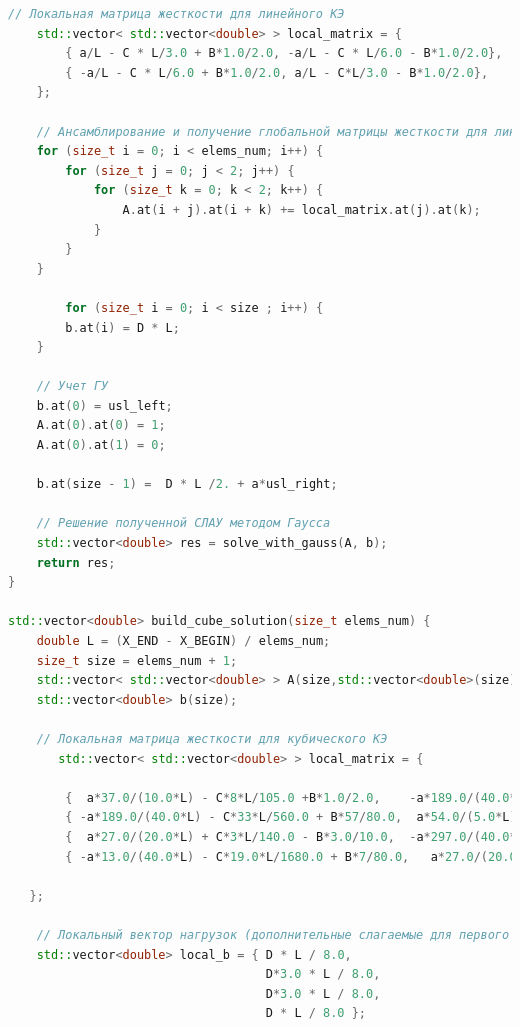 \begin{lstlisting}[language=c++, label=prog,caption={\textit{Реализация МКЭ}}]
    // Локальная матрица жесткости для линейного КЭ
    std::vector< std::vector<double> > local_matrix = {
        { a/L - C * L/3.0 + B*1.0/2.0, -a/L - C * L/6.0 - B*1.0/2.0},
        { -a/L - C * L/6.0 + B*1.0/2.0, a/L - C*L/3.0 - B*1.0/2.0},
    };
    
    // Ансамблирование и получение глобальной матрицы жесткости для линейного КЭ
    for (size_t i = 0; i < elems_num; i++) {
        for (size_t j = 0; j < 2; j++) {
            for (size_t k = 0; k < 2; k++) {
                A.at(i + j).at(i + k) += local_matrix.at(j).at(k);
            }
        }
    }
    
        for (size_t i = 0; i < size ; i++) {
        b.at(i) = D * L;
    }
    
    // Учет ГУ 
    b.at(0) = usl_left;
    A.at(0).at(0) = 1;
    A.at(0).at(1) = 0;
    
    b.at(size - 1) =  D * L /2. + a*usl_right;
    
    // Решение полученной СЛАУ методом Гаусса
    std::vector<double> res = solve_with_gauss(A, b);
    return res;
}

std::vector<double> build_cube_solution(size_t elems_num) {
    double L = (X_END - X_BEGIN) / elems_num;
    size_t size = elems_num + 1;
    std::vector< std::vector<double> > A(size,std::vector<double>(size));
    std::vector<double> b(size);
    
    // Локальная матрица жесткости для кубического КЭ
       std::vector< std::vector<double> > local_matrix = {

        {  a*37.0/(10.0*L) - C*8*L/105.0 +B*1.0/2.0,    -a*189.0/(40.0*L) - C*33*L/560.0 - B*57/80.0, a*27.0/(20.0*L) + C*3*L/140.0 + B*3.0/10.0, -a*13.0/(40.0*L) -  C*19.0*L/1680.0 - B*7/80.0},
        { -a*189.0/(40.0*L) - C*33*L/560.0 + B*57/80.0,  a*54.0/(5.0*L)-C*27*L/70.0,                  -a*297.0/(40*L) + C*27*L/560.0 - B*81.0/80.0,    a*27.0/(20.0*L) +  C*3*L/140.0 + B*3.0/10.0},
        {  a*27.0/(20.0*L) + C*3*L/140.0 - B*3.0/10.0,  -a*297.0/(40.0*L) + C*27*L/560.0 + B*81.0/80.0,  a*54.0/(5.0*L) - C*27*L/70.0,                -a*189.0/(40.0*L) - C*33*L/560.0 - B*57/80.0},
        { -a*13.0/(40.0*L) - C*19.0*L/1680.0 + B*7/80.0,   a*27.0/(20.0*L) + C*3*L/140.0 - B*3.0/10.0 , -a*189.0/(40.0*L) - C*33*L/560.0 + B*57/80.0,      a*37.0/(10.0*L) - C*8*L/105.0 - B*1.0/2.0}
        
   };
    
    // Локальный вектор нагрузок (дополнительные слагаемые для первого и последнего элементов учитываются далее)
    std::vector<double> local_b = { D * L / 8.0,
                                    D*3.0 * L / 8.0,
                                    D*3.0 * L / 8.0, 
                                    D * L / 8.0 };


\end{lstlisting}
